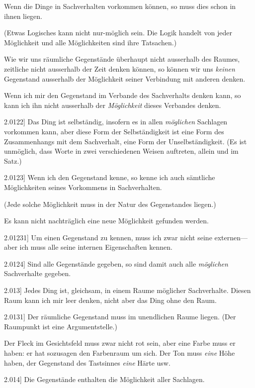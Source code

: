 \documentclass[12pt,oneside]{book}[2007/10/19]
\newcommand{\PropERef}[1]{\hyperref[PropE:#1]{#1}}
\newcommand{\PropositionG}[2]{%
  \item[\phantomsection\label{PropG:#1}\PropERef{#1}] #2%
}
\newcommand{\Emph}[1]{\emph{#1}}%
\begin{document}
\begin{propositions}
{Wenn die Dinge in Sachverhalten vorkommen
können, so muss dies schon in ihnen liegen.

(Etwas Logisches kann nicht nur-möglich sein.
Die Logik handelt von jeder Möglichkeit und alle
Möglichkeiten sind ihre Tatsachen.)

Wie wir uns räumliche Gegenstände überhaupt
nicht ausserhalb des Raumes, zeitliche nicht ausserhalb
der Zeit denken können, so können wir uns
\Emph{keinen} Gegenstand ausserhalb der Möglichkeit
seiner Verbindung mit anderen denken.

Wenn ich mir den Gegenstand im Verbande
des Sachverhalts denken kann, so kann ich ihn
nicht ausserhalb der \Emph{Möglichkeit} dieses Verbandes
denken.}


\PropositionG{2.0122}
{Das Ding ist selbständig, insofern es in allen
\Emph{möglichen} Sachlagen vorkommen kann, aber
diese Form der Selbständigkeit ist eine Form des
Zusammenhangs mit dem Sachverhalt, eine Form
der Unselbständigkeit. (Es ist unmöglich, dass
Worte in zwei verschiedenen Weisen auftreten,
allein und im Satz.)}


\PropositionG{2.0123}
{Wenn ich den Gegenstand kenne, so kenne ich
auch sämtliche Möglichkeiten seines Vorkommens
in Sachverhalten.

(Jede solche Möglichkeit muss in der Natur des
Gegenstandes liegen.)

Es kann nicht nachträglich eine neue Möglichkeit
gefunden werden.}


\PropositionG{2.01231}
{Um einen Gegenstand zu kennen, muss ich zwar
nicht seine externen---aber ich muss alle seine
internen Eigenschaften kennen.}


\PropositionG{2.0124}
{Sind alle Gegenstände gegeben, so sind damit
auch alle \Emph{möglichen} Sachverhalte gegeben.}


\PropositionG{2.013}
{Jedes Ding ist, gleichsam, in einem Raume
möglicher Sachverhalte. Diesen Raum kann ich
mir leer denken, nicht aber das Ding ohne den
Raum.}


\PropositionG{2.0131}
{Der räumliche Gegenstand muss im unendlichen
Raume liegen. (Der Raumpunkt ist eine Argumentstelle.)

Der Fleck im Gesichtsfeld muss zwar nicht rot
sein, aber eine Farbe muss er haben: er hat sozusagen
den Farbenraum um sich. Der Ton muss
\Emph{eine} Höhe haben, der Gegenstand des Tastsinnes
\Emph{eine} Härte usw.}


\PropositionG{2.014}
{Die Gegenstände enthalten die Möglichkeit aller
Sachlagen.}



\end{propositions}
\end{document}

